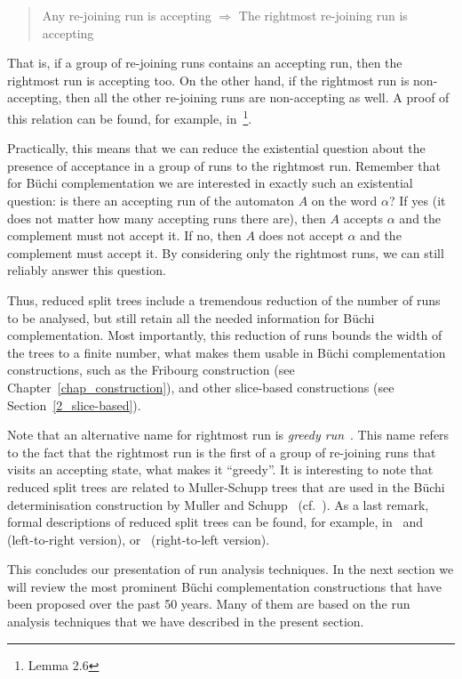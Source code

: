 \begin{quote}
\centering
Any re-joining run is accepting $\Longrightarrow$ The rightmost re-joining run is accepting
\end{quote}

That is, if a group of re-joining runs contains an accepting run, then the rightmost run is accepting too. On the other hand, if the rightmost run is non-accepting, then all the other re-joining runs are non-accepting as well. A proof of this relation can be found, for example, in~\cite{vardi2007automata}\footnote{Lemma 2.6}.

Practically, this means that we can reduce the existential question about the presence of acceptance in a group of runs to the rightmost run. Remember that for Büchi complementation we are interested in exactly such an existential question: is there an accepting run of the automaton $A$ on the word $\alpha$? If yes (it does not matter how many accepting runs there are), then $A$ accepts $\alpha$ and the complement must not accept it. If no, then $A$ does not accept $\alpha$ and the complement must accept it. By considering only the rightmost runs, we can still reliably answer this question.

Thus, reduced split trees include a tremendous reduction of the number of runs to be analysed, but still retain all the needed information for Büchi complementation. Most importantly, this reduction of runs bounds the width of the trees to a finite number, what makes them usable in Büchi complementation constructions, such as the Fribourg construction (see Chapter~\ref{chap_construction}), and other slice-based constructions (see Section~\ref{2_slice-based}).

Note that an alternative name for rightmost run is \textit{greedy run}~\cite{2014_joel_ulrich}. This name refers to the fact that the rightmost run is the first of a group of re-joining runs that visits an accepting state, what makes it ``greedy''. It is interesting to note that reduced split trees are related to Muller-Schupp trees that are used in the Büchi determinisation construction by Muller and Schupp~\cite{Muller199569} (cf.~\cite{vardi2007automata,fogarty2013unifying}). As a last remark, formal descriptions of reduced split trees can be found, for example, in~\cite{vardi2007automata} and~\cite{2014_wilke} (left-to-right version), or~\cite{fogarty2013unifying} (right-to-left version).

This concludes our presentation of run analysis techniques. In the next section we will review the most prominent Büchi complementation constructions that have been proposed over the past 50 years. Many of them are based on the run analysis techniques that we have described in the present section.


